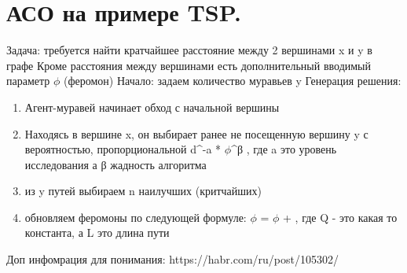 \section{АСО на примере TSP.}
Задача: требуется найти кратчайшее расстояние между 2 вершинами x и y в графе
Кроме расстояния между вершинами есть дополнительный вводимый параметр $\phi$ (феромон)
Начало: задаем количество муравьев y 
Генерация решения:
\begin{enumerate} 
	\item Агент-муравей начинает обход с начальной вершины
	\item Находясь в вершине x, он выбирает ранее не посещенную вершину y с вероятностью, пропорциональной d^-a * $\phi$^β , где a это уровень исследования а β жадность алгоритма
	\item из y путей выбираем n наилучших (критчайших)
	\item обновляем феромоны по следующей формуле: $\phi$ = $\phi$ +  , где Q - это какая то константа, а L это длина пути
\end{enumerate}
Доп инфомрация для понимания: https://habr.com/ru/post/105302/

